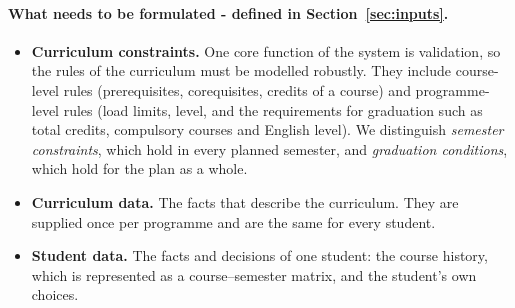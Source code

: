 \documentclass[10pt,a4paper]{article}
\begin{document}
\paragraph{What needs to be formulated - defined in Section~\ref{sec:inputs}.}
\begin{itemize}
      \item \textbf{Curriculum constraints.} One core function of the system is validation, so the rules of the curriculum must be modelled robustly. They include course-level rules (prerequisites, corequisites, credits of a course) and programme-level rules (load limits, level, and the requirements for graduation such as total credits, compulsory courses and English level). We distinguish \emph{semester constraints}, which hold in every planned semester, and \emph{graduation conditions}, which hold for the plan as a whole.
      \item \textbf{Curriculum data.} The facts that describe the curriculum. They are supplied once per programme and are the same for every student.
      \item \textbf{Student data.} The facts and decisions of one student: the course history, which is represented as a course--semester matrix, and the student's own choices.
\end{itemize}
\end{document}
